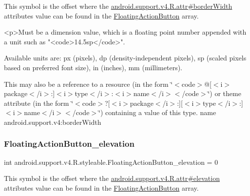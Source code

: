 This symbol is the offset where the \hyperlink{classandroid_1_1support_1_1v4_1_1R_1_1attr_a05efc50b5af682c842a413b753b38a20}{android.\+support.\+v4.\+R.\+attr\#border\+Width} attribute\textquotesingle{}s value can be found in the \hyperlink{classandroid_1_1support_1_1v4_1_1R_1_1styleable_ad3363bb32f8e5e0dde36b5e32146816b}{Floating\+Action\+Button} array.

\begin{DoxyVerb}      <p>Must be a dimension value, which is a floating point number appended with a unit such as "<code>14.5sp</code>".
\end{DoxyVerb}
 Available units are\+: px (pixels), dp (density-\/independent pixels), sp (scaled pixels based on preferred font size), in (inches), mm (millimeters). 

This may also be a reference to a resource (in the form \char`\"{}$<$code$>$@\mbox{[}$<$i$>$package$<$/i$>$\+:\mbox{]}$<$i$>$type$<$/i$>$\+:$<$i$>$name$<$/i$>$$<$/code$>$\char`\"{}) or theme attribute (in the form \char`\"{}$<$code$>$?\mbox{[}$<$i$>$package$<$/i$>$\+:\mbox{]}\mbox{[}$<$i$>$type$<$/i$>$\+:\mbox{]}$<$i$>$name$<$/i$>$$<$/code$>$\char`\"{}) containing a value of this type.  name android.\+support.\+v4\+:border\+Width \mbox{\label{classandroid_1_1support_1_1v4_1_1R_1_1styleable_a9d53e5c6b5c18f38915b509ebada1d58}} 
\subsubsection{\texorpdfstring{Floating\+Action\+Button\+\_\+elevation}{FloatingActionButton\_elevation}}
{\footnotesize\ttfamily int android.\+support.\+v4.\+R.\+styleable.\+Floating\+Action\+Button\+\_\+elevation = 0\hspace{0.3cm}{\ttfamily [static]}}

This symbol is the offset where the \hyperlink{classandroid_1_1support_1_1v4_1_1R_1_1attr_a5906f91b859c693a38a88ad3b0be4a39}{android.\+support.\+v4.\+R.\+attr\#elevation} attribute\textquotesingle{}s value can be found in the \hyperlink{classandroid_1_1support_1_1v4_1_1R_1_1styleable_ad3363bb32f8e5e0dde36b5e32146816b}{Floating\+Action\+Button} array.

